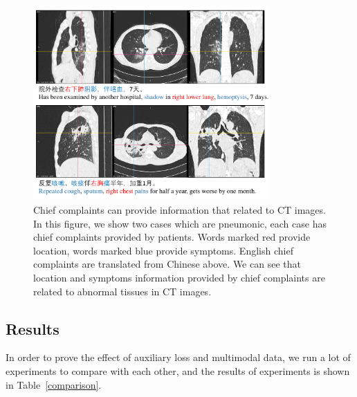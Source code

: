 \documentclass[journal]{IEEEtran}
\begin{document}
\begin{figure}[t]
\centerline{\includegraphics[width=90mm]{txtpic.pdf}}
\vspace{-0cm}
\caption{Chief complaints can provide information that related to CT images. In this figure, we show two cases which are pneumonic, each case has chief complaints provided by patients. Words marked red provide location, words marked blue provide symptoms. English chief complaints are translated from Chinese above. We can see that location and symptoms information provided by chief complaints are related to abnormal tissues in CT images.}
\vspace{-0cm}
\label{txtpic}
\end{figure}

\subsection{Results}
\label{results}
In order to prove the effect of auxiliary loss and multimodal data, we run a lot of experiments to compare with each other, and the results of experiments is shown in Table~\ref{comparison}.
\end{document}
